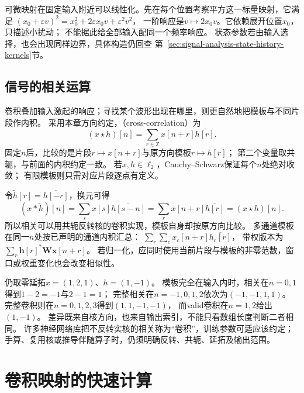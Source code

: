可微映射在固定输入附近可以线性化。先在每个位置考察平方这一标量映射，它满足
$(x_0+\varepsilon v)^2=x_0^2+2\varepsilon x_0v+\varepsilon^2v^2$，
一阶响应是$v\mapsto2x_0v$。它依赖展开位置$x_0$，只描述小扰动；
不能据此给全部输入配同一个频率响应。
状态参数若由输入选择，也会出现同样边界，具体构造仍回查
第~\ref{sec:signal-analysis-state-history-kernels}节。

\subsection{信号的相关运算}
\label{sec:signal-template-correlation}

卷积叠加输入激起的响应；寻找某个波形出现在哪里，则更自然地把模板与不同片段作内积。
采用本章方向约定，（cross-correlation）为
\begin{equation}
  (x\star h)[n]=\sum_{r\in\mathbb Z}x[n+r]\overline{h[r]}.
  \label{eq:signal-analysis-cross-correlation}
\end{equation}
固定$n$后，比较的是片段$r\mapsto x[n+r]$与原方向模板$r\mapsto h[r]$；
第二个变量取共轭，与前面的内积约定一致。
若$x,h\in\ell_2$，Cauchy--Schwarz保证每个$n$处绝对收敛；
有限模板则只需对应片段逐点有定义。

令$\widetilde h[r]=\overline{h[-r]}$，换元可得
\[
  (x*\widetilde h)[n]=\sum_s x[s]\overline{h[s-n]}
  =\sum_r x[n+r]\overline{h[r]}=(x\star h)[n].
\]
所以相关可以用共轭反转核的卷积实现，模板自身却按原方向比较。
多通道模板在同一$n$处按已声明的通道内积汇总：
$\sum_r\sum_c x_c[n+r]\overline{h_c[r]}$，
带权版本为$\sum_r\bm h[r]^*\bm W\bm x[n+r]$。
若归一化，应同时使用当前片段与模板的非零范数，窗口或权重变化也会改变相似性。

仍取零延拓$x=(1,2,1)$、$h=(1,-1)$。
模板完全在输入内时，相关在$n=0,1$得到$1-2=-1$与$2-1=1$；
完整相关在$n=-1,0,1,2$依次为$(-1,-1,1,1)$。
完整卷积则在$n=0,1,2,3$得到$(1,1,-1,-1)$，
而valid卷积在$n=1,2$给出$(1,-1)$。
差异既来自核方向，也来自输出索引，不能只看数组长度判断二者相同。
许多神经网络库把不反转实核的相关称为“卷积”，训练参数可适应该约定；
手算、复用核或推导伴随算子时，仍须明确反转、共轭、延拓及输出范围。

\section{卷积映射的快速计算}
\label{sec:signal-analysis-fast-transforms}

